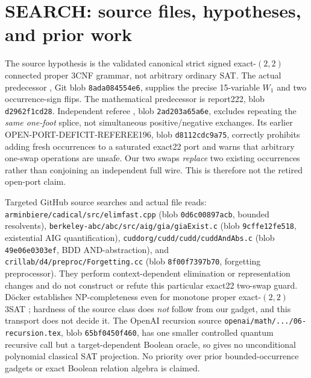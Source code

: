 \documentclass[11pt]{article}
\begin{document}
\section{SEARCH: source files, hypotheses, and prior work}
The source hypothesis is the validated canonical strict signed exact-$(2,2)$ connected proper 3CNF grammar, not arbitrary ordinary SAT. The actual predecessor , Git blob \texttt{8ada084554e6}, supplies the precise 15-variable $W_1$ and two occurrence-sign flips. The mathematical predecessor is report222, blob \texttt{d2962f1cd28}. Independent referee , blob \texttt{2ad203a65a6e}, excludes repeating the \emph{same one-foot} splice, not simultaneous positive/negative exchanges. Its earlier OPEN-PORT-DEFICIT-REFEREE196, blob \texttt{d8112cdc9a75}, correctly prohibits adding fresh occurrences to a saturated exact22 port and warns that arbitrary one-swap operations are unsafe. Our two swaps \emph{replace} two existing occurrences rather than conjoining an independent full wire. This is therefore not the retired open-port claim.

Targeted GitHub source searches and actual file reads: \texttt{arminbiere/cadical/src/elimfast.cpp} (blob \texttt{0d6c00897acb}, bounded resolvents), \texttt{berkeley-abc/abc/src/aig/gia/giaExist.c} (blob \texttt{9cffe12fe518}, existential AIG quantification), \texttt{cuddorg/cudd/cudd/cuddAndAbs.c} (blob \texttt{49e06e0303ef}, BDD AND-abstraction), and \texttt{crillab/d4/preproc/Forgetting.cc} (blob \texttt{8f00f7397b70}, forgetting preprocessor). They perform context-dependent elimination or representation changes and do not construct or refute this particular exact22 two-swap guard. D\"ocker establishes NP-completeness even for monotone proper exact-$(2,2)$ 3SAT \cite{docker}; hardness of the source class does \emph{not} follow from our gadget, and this transport does not decide it. The OpenAI recursion source \texttt{openai/math/.../06-recursion.tex}, blob \texttt{65bf0450f460}, has one smaller controlled quantum recursive call but a target-dependent Boolean oracle, so gives no unconditional polynomial classical SAT projection. No priority over prior bounded-occurrence gadgets or exact Boolean relation algebra is claimed.
\end{document}
